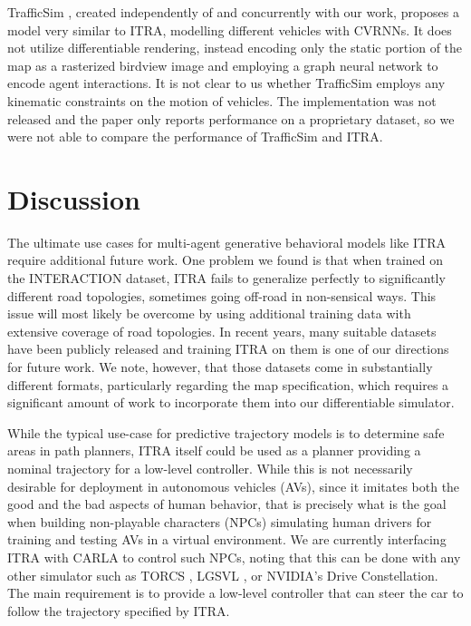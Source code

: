 \documentclass[letterpaper, 10 pt, conference]{ieeeconf}
\begin{document}
TrafficSim \cite{suo_trafficsim_2021}, created independently of and concurrently with our work, proposes a model very similar to ITRA, modelling different vehicles with CVRNNs. It does not utilize differentiable rendering, instead encoding only the static portion of the map as a rasterized birdview image and employing a graph neural network to encode agent interactions. It is not clear to us whether TrafficSim employs any kinematic constraints on the motion of vehicles. The implementation was not released and the paper only reports performance on a proprietary dataset, so we were not able to compare the performance of TrafficSim and ITRA.


\section{Discussion}

The ultimate use cases for multi-agent generative behavioral models like ITRA require additional future work. One problem we found is that when trained on the INTERACTION dataset, ITRA fails to generalize perfectly to significantly different road topologies, sometimes going off-road in non-sensical ways. This issue will most likely be overcome by using additional training data with extensive coverage of road topologies. In recent years, many suitable datasets have been publicly released \cite{caesar_nuscenes_2020, breuer_opendd_2020, krajewski_highd_2018, krajewski_round_2020, houston_one_2020} and training ITRA on them is one of our directions for future work. We note, however, that those datasets come in substantially different formats, particularly regarding the map specification, which requires a significant amount of work to incorporate them into our differentiable simulator.

While the typical use-case for predictive trajectory models is to determine safe areas in path planners, ITRA itself could be used as a planner providing a nominal trajectory for a low-level controller. While this is not necessarily desirable for deployment in autonomous vehicles (AVs), since it imitates both the good and the bad aspects of human behavior, that is precisely what is the goal when building non-playable characters (NPCs) simulating human drivers for training and testing AVs in a virtual environment. We are currently interfacing ITRA with CARLA \cite{dosovitskiy_carla_2017} to control such NPCs, noting that this can be done with any other simulator such as TORCS \cite{wymann_torcs_2014}, LGSVL \cite{rong_lgsvl_2020}, or NVIDIA's Drive Constellation. The main requirement is to provide a low-level controller that can steer the car to follow the trajectory specified by ITRA.
\end{document}

